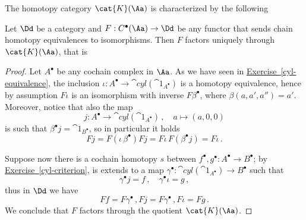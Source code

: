 The homotopy category $\cat{K}(\Aa)$ is characterized by the following
\begin{prop}
    Let $\Dd$ be a category and $F : C^{\bullet}(\Aa) \to \Dd$
    be any functor that sends chain homotopy equivalences
    to isomorphisms. Then $F$ factors uniquely through $\cat{K}(\Aa)$,
    that is
    \begin{center}
    \end{center}
    \begin{proof}
        Let $A^{\bullet}$ be any cochain complex in $\Aa$.
        As we have seen in 
        \hyperref[cyl-equivalence]{Exercise~\ref*{cyl-equivalence}},
        the inclusion $\iota : A^{\bullet} \to \cat{cyl}(\cat{1}_{A^{\bullet}})$
        is a homotopy equivalence, hence by assumption
        $F\iota$ is an isomorphism with inverse $F\beta^{\bullet}$,
        where $\beta(a,a',a'') =  a'$. Moreover, notice that also the map
        \begin{equation*}
            j: A^{\bullet} \longrightarrow \cat{cyl}(\cat{1}_{A^{\bullet}})\,,
            \quad a \longmapsto (a,0,0)
        \end{equation*}
        is such that $\beta^{\bullet}j=\cat{1}_{B^{\bullet}}$,
        so in particular it holds
        \begin{equation*}
            Fj = F(\iota\,\beta^{\bullet})Fj
            = F\iota\,F(\beta^{\bullet}j) = F\iota\,.
        \end{equation*}

        Suppose now there is a cochain homotopy
        $s$ between $f^{\bullet}, g^{\bullet} : A^{\bullet} \to B^{\bullet}$;
        by \hyperref[cyl-criterion]{Exercise~\ref*{cyl-criterion}},
        is extends to a map $\gamma^{\bullet}:\cat{cyl}(\cat{1}_{A^{\bullet}}) 
        \to B^{\bullet}$ such that
        \begin{equation*}
            \gamma^{\bullet} j = f\,, \quad \gamma^{\bullet} \iota = g\,,
        \end{equation*}
        thus in $\Dd$ we have
        \begin{equation*}
            Ff = F\gamma^{\bullet}\,,Fj = F\gamma^{\bullet}\,,F\iota = Fg\,.
        \end{equation*}
        We conclude that $F$ factors through the quotient $\cat{K}(\Aa)$.
    \end{proof}
\end{prop}

